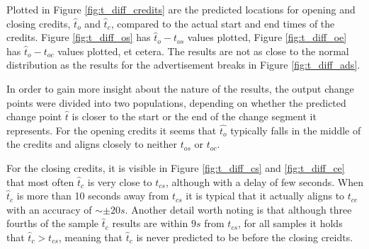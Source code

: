 Plotted in Figure \ref{fig:t_diff_credits} are the predicted locations for opening and closing credits, $\hat{t}_o$ and $\hat{t}_c$, compared to the actual start and end times of the credits. Figure \ref{fig:t_diff_os} has $\hat{t}_o-t_{os}$ values plotted, Figure \ref{fig:t_diff_oe} has $\hat{t}_o-t_{oc}$ values plotted, et cetera. The results are not as close to the normal distribution as the results for the advertisement breaks in Figure \ref{fig:t_diff_ads}.

In order to gain more insight about the nature of the results, the output change points were divided into two populations, depending on whether the predicted change point $\hat{t}$ is closer to the start or the end of the change segment it represents. For the opening credits it seems that $\hat{t_o}$ typically falls in the middle of the credits  and aligns closely to neither $t_{os}$ or $t_{oc}$. %

For the closing credits, it is visible in Figure \ref{fig:t_diff_cs} and \ref{fig:t_diff_ce} that most often $\hat{t}_c$ is very close to $t_{cs}$, although with a delay of few seconds. When $\hat{t}_c$ is more than 10 seconds away from $t_{cs}$ it is typical that it actually aligns to $t_{ce}$ with an accuracy of $\sim \pm 20 s$. Another detail worth noting is that although three fourths of the sample $\hat{t}_c$ results are within $9 s$ from $t_{cs}$, for all samples it holds that $ \hat{t}_c > t_{cs}$, meaning that $\hat{t}_c$ is never predicted to be before the closing creidts.

